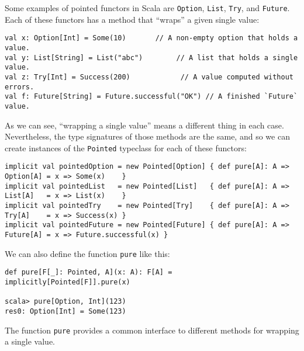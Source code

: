Some examples of pointed functors in Scala are \lstinline!Option!,
\lstinline!List!, \lstinline!Try!, and \lstinline!Future!. Each
of these functors has a method that \textsf{``}wraps\textsf{''} a given single value:
\begin{lstlisting}
val x: Option[Int] = Some(10)       // A non-empty option that holds a value.
val y: List[String] = List("abc")        // A list that holds a single value.
val z: Try[Int] = Success(200)            // A value computed without errors.
val f: Future[String] = Future.successful("OK") // A finished `Future` value.
\end{lstlisting}
As we can see, \textsf{``}wrapping a single value\textsf{''} means a different thing
in each case. Nevertheless, the type signatures of those methods are
the same, and so we can create instances of the \lstinline!Pointed!
typeclass for each of these functors:
\begin{lstlisting}
implicit val pointedOption = new Pointed[Option] { def pure[A]: A => Option[A] = x => Some(x)    }
implicit val pointedList   = new Pointed[List]   { def pure[A]: A => List[A]   = x => List(x)    }
implicit val pointedTry    = new Pointed[Try]    { def pure[A]: A => Try[A]    = x => Success(x) }
implicit val pointedFuture = new Pointed[Future] { def pure[A]: A => Future[A] = x => Future.successful(x) }
\end{lstlisting}
We can also define the function \lstinline!pure! like this:
\begin{lstlisting}
def pure[F[_]: Pointed, A](x: A): F[A] = implicitly[Pointed[F]].pure(x)

scala> pure[Option, Int](123)
res0: Option[Int] = Some(123)
\end{lstlisting}
The function \lstinline!pure! provides a common interface to different
methods for wrapping a single value.

